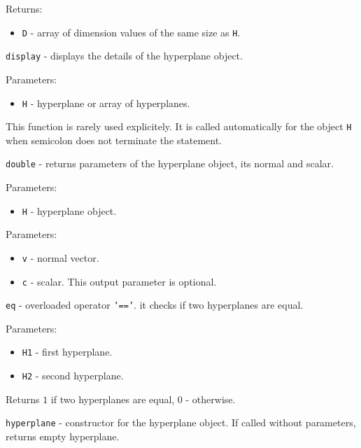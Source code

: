 \documentclass{report}
\begin{document}
Returns:
\begin{itemize}
\item {\tt D} - array of dimension values of the same size as {\tt H}.
\end{itemize}



\newpage

{\Large {\tt display}} - displays the details of the hyperplane object.

Parameters:
\begin{itemize}
\item {\tt H} - hyperplane or array of hyperplanes.
\end{itemize}
This function is rarely used explicitely. It is called automatically
for the object {\tt H} when semicolon does not terminate the statement.

\newpage

{\Large {\tt double}} - returns parameters of the hyperplane object,
its normal and scalar.

Parameters:
\begin{itemize}
\item {\tt H} - hyperplane object.
\end{itemize}

Parameters:
\begin{itemize}
\item {\tt v} - normal vector.
\item {\tt c} - scalar. This output parameter is optional.
\end{itemize}

\newpage

{\Large {\tt eq}} - overloaded operator {\tt '=='}.
it checks if two hyperplanes are equal.

Parameters:
\begin{itemize}
\item {\tt H1} - first hyperplane.
\item {\tt H2} - second hyperplane.
\end{itemize}

Returns $1$ if two hyperplanes are equal, $0$ - otherwise.



\newpage

{\Large {\tt hyperplane}} - constructor for the hyperplane object.
If called without parameters, returns empty hyperplane.
\end{document}

